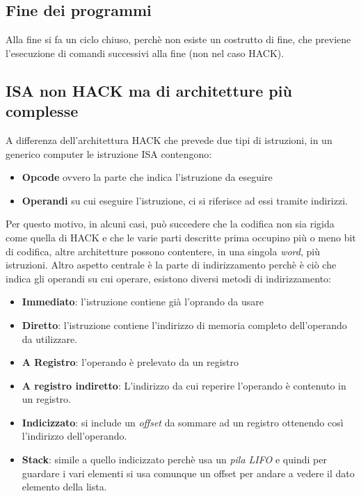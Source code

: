 \documentclass{article}
\begin{document}
\subsection{Fine dei programmi}
Alla fine si fa un ciclo chiuso, perchè non esiste un costrutto di fine, che previene l'esecuzione di comandi successivi alla fine (non nel caso HACK).

\subsection{ISA non HACK ma di architetture più complesse}
A differenza dell'architettura HACK che prevede due tipi di istruzioni, in un generico computer le istruzione ISA contengono:
\begin{itemize}
    \item \textbf{Opcode} ovvero la parte che indica l'istruzione da eseguire
    \item \textbf{Operandi} su cui eseguire l'istruzione, ci si riferisce ad essi tramite indirizzi.
\end{itemize}
Per questo motivo, in alcuni casi, può succedere che la codifica non sia rigida come quella di HACK e che le varie parti descritte prima occupino più o meno bit di codifica, altre architetture possono contentere, in una singola \textit{word}, più istruzioni.
Altro aspetto centrale è la parte di indirizzamento perchè è ciò che indica gli operandi su cui operare, esistono diversi metodi di indirizzamento:
\begin{itemize}
    \item \textbf{Immediato}: l'istruzione contiene già l'oprando da usare
    \item \textbf{Diretto}: l'istruzione contiene l'indirizzo di memoria completo dell'operando da utilizzare.
    \item \textbf{A Registro}: l'operando è prelevato da un registro
    \item \textbf{A registro indiretto}: L'indirizzo da cui reperire l'operando è contenuto in un registro.
    \item \textbf{Indicizzato}: si include un \textit{offset} da sommare ad un registro ottenendo così l'indirizzo dell'operando.
    \item \textbf{Stack}: simile a quello indicizzato perchè usa un \textit{pila LIFO} e quindi per guardare i vari elementi si usa comunque un offset per andare a vedere il dato elemento della lista.
\end{itemize}
\end{document}

